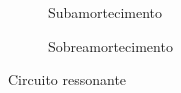 \begin{figure}[H]
	\centering

	\begin{subfigure}{\textwidth}
	    \centering
	    
        \caption{Subamortecimento}
        \label{fig:subamortecido}
	\end{subfigure}
	\qquad
	\begin{subfigure}{\textwidth}
	    \centering
	    
        \caption{Sobreamortecimento}
        \label{fig:sobreamortecido}
	\end{subfigure}

	\caption{Circuito ressonante}
	\label{fig:amortecidos}
\end{figure}